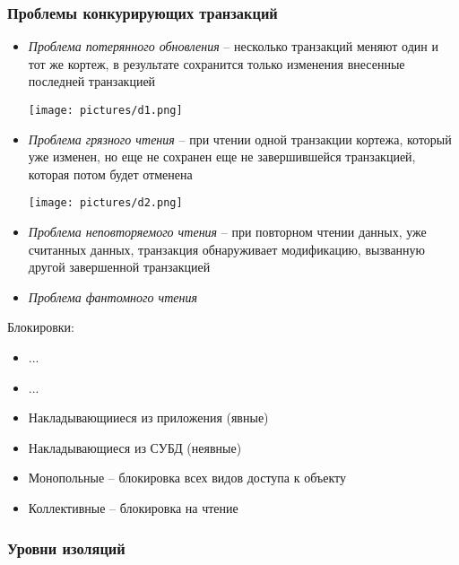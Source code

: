 \documentclass[12pt, a4paper]{article}
\begin{document}
\subsubsection{Проблемы конкурирующих транзакций}
\begin{itemize}
    \item \emph{Проблема потерянного обновления} -- несколько транзакций меняют один и тот же кортеж, в результате сохранится только изменения внесенные последней транзакцией
    
    \texttt{[image: pictures/d1.png]}
    
    \item \emph{Проблема грязного чтения} -- при чтении одной транзакции кортежа, который уже изменен, но еще не сохранен еще не завершившейся транзакцией, которая потом будет отменена
    
    \texttt{[image: pictures/d2.png]}
    \item \emph{Проблема неповторяемого чтения} -- при повторном чтении данных, уже считанных данных, транзакция обнаруживает модификацию, вызванную другой завершенной транзакцией
    
    \item \emph{Проблема фантомного чтения}

\end{itemize}

Блокировки:
\begin{itemize}
    \item ...
    \item ...
\end{itemize}

\begin{itemize}
    \item Накладывающииеся из приложения (явные)
    \item Накладывающиеся из СУБД (неявные)
\end{itemize}

\begin{itemize}
    \item Монопольные -- блокировка всех видов доступа к объекту
    \item Коллективные -- блокировка на чтение
\end{itemize}

\newpage

\subsubsection{Уровни изоляций}
\end{document}
